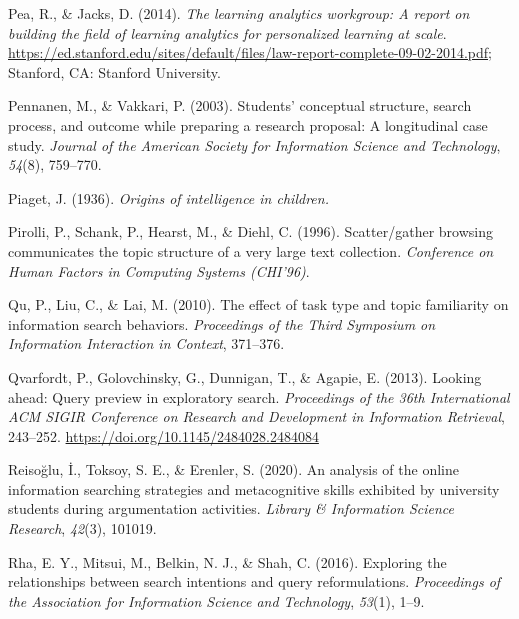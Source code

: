 \documentclass[letterpaper, nobind]{templates/ociamthesis}
\newlength{\cslhangindent}
\newenvironment{CSLReferences}[2] %
 {%
  \setlength{\parindent}{0pt}
  \ifodd #1
  \let\oldpar\par
  \def\par{\hangindent=\cslhangindent\oldpar}
  \fi
  \setlength{\parskip}{1mm}
  \setlength{\baselineskip}{6mm}
 }%
 {}
\begin{document}
\begin{CSLReferences}{1}{0}
\leavevmode{}%
Pea, R., \& Jacks, D. (2014). \emph{The learning analytics workgroup: A report on building the field of learning analytics for personalized learning at scale}. \url{https://ed.stanford.edu/sites/default/files/law-report-complete-09-02-2014.pdf}; Stanford, CA: Stanford University.

\leavevmode{}%
Pennanen, M., \& Vakkari, P. (2003). Students' conceptual structure, search process, and outcome while preparing a research proposal: A longitudinal case study. \emph{Journal of the American Society for Information Science and Technology}, \emph{54}(8), 759--770.

\leavevmode{}%
Piaget, J. (1936). \emph{Origins of intelligence in children.}

\leavevmode{}%
Pirolli, P., Schank, P., Hearst, M., \& Diehl, C. (1996). Scatter/gather browsing communicates the topic structure of a very large text collection. \emph{Conference on Human Factors in Computing Systems (CHI'96)}.

\leavevmode{}%
Qu, P., Liu, C., \& Lai, M. (2010). The effect of task type and topic familiarity on information search behaviors. \emph{Proceedings of the Third Symposium on Information Interaction in Context}, 371--376.

\leavevmode{}%
Qvarfordt, P., Golovchinsky, G., Dunnigan, T., \& Agapie, E. (2013). Looking ahead: {Query} preview in exploratory search. \emph{Proceedings of the 36th International {ACM SIGIR} Conference on Research and Development in Information Retrieval}, 243--252. \url{https://doi.org/10.1145/2484028.2484084}

\leavevmode{}%
Reisoğlu, İ., Toksoy, S. E., \& Erenler, S. (2020). An analysis of the online information searching strategies and metacognitive skills exhibited by university students during argumentation activities. \emph{Library \& Information Science Research}, \emph{42}(3), 101019.

\leavevmode{}%
Rha, E. Y., Mitsui, M., Belkin, N. J., \& Shah, C. (2016). Exploring the relationships between search intentions and query reformulations. \emph{Proceedings of the Association for Information Science and Technology}, \emph{53}(1), 1--9.


\end{CSLReferences}
\end{document}
